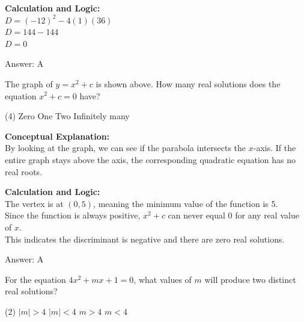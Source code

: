 \documentclass[11pt,paper=a4,answers]{exam}
\begin{document}
\begin{questions}
\begin{solution}
\vspace{20pt}

\textbf{Calculation and Logic:} \\
$D = (-12)^2 - 4(1)(36)$ \\
$D = 144 - 144$ \\
$D = 0$

\vspace{25pt}

Answer: \colorbox{yellow!100}{A}
\end{solution}

\vspace{40pt}

\question

The graph of $y = x^2 + c$ is shown above. How many real solutions does the equation $x^2 + c = 0$ have?
\begin{tasks}(4)
    \task Zero
    \task One
    \task Two
    \task Infinitely many
\end{tasks}

\begin{solution}
\textbf{Conceptual Explanation:} \\
By looking at the graph, we can see if the parabola intersects the $x$-axis. If the entire graph stays above the axis, the corresponding quadratic equation has no real roots.

\vspace{20pt}

\textbf{Calculation and Logic:} \\
The vertex is at $(0, 5)$, meaning the minimum value of the function is 5. \\
Since the function is always positive, $x^2 + c$ can never equal 0 for any real value of $x$. \\
This indicates the discriminant is negative and there are zero real solutions.

\vspace{25pt}

Answer: \colorbox{yellow!100}{A}
\end{solution}

\vspace{40pt}

\question
For the equation $4x^2 + mx + 1 = 0$, what values of $m$ will produce two distinct real solutions?
\begin{tasks}(2)
    \task $|m| > 4$
    \task $|m| < 4$
    \task $m > 4$
    \task $m < 4$
\end{tasks}


\end{questions}
\end{document}
